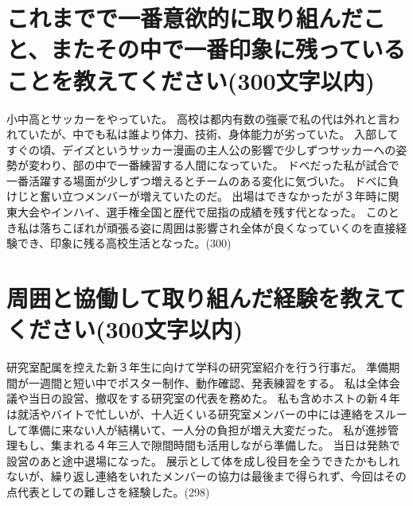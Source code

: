 \documentclass[platex,dvipdfmx]{jlreq}			%
\begin{document}
\section{これまでで一番意欲的に取り組んだこと、またその中で一番印象に残っていることを教えてください(300文字以内)}
小中高とサッカーをやっていた。
高校は都内有数の強豪で私の代は外れと言われていたが、中でも私は誰より体力、技術、身体能力が劣っていた。
入部してすぐの頃、デイズというサッカー漫画の主人公の影響で少しずつサッカーへの姿勢が変わり、部の中で一番練習する人間になっていた。
ドベだった私が試合で一番活躍する場面が少しずつ増えるとチームのある変化に気づいた。
ドベに負けじと奮い立つメンバーが増えていたのだ。
出場はできなかったが３年時に関東大会やインハイ、選手権全国と歴代で屈指の成績を残す代となった。
このとき私は落ちこぼれが頑張る姿に周囲は影響され全体が良くなっていくのを直接経験でき、印象に残る高校生活となった。(300)


\section{周囲と協働して取り組んだ経験を教えてください(300文字以内)}
研究室配属を控えた新３年生に向けて学科の研究室紹介を行う行事だ。
準備期間が一週間と短い中でポスター制作、動作確認、発表練習をする。
私は全体会議や当日の設営、撤収をする研究室の代表を務めた。
私も含めホストの新４年は就活やバイトで忙しいが、十人近くいる研究室メンバーの中には連絡をスルーして準備に来ない人が結構いて、一人分の負担が増え大変だった。
私が進捗管理もし、集まれる４年三人で隙間時間も活用しながら準備した。
当日は発熱で設営のあと途中退場になった。
展示として体を成し役目を全うできたかもしれないが、繰り返し連絡をいれたメンバーの協力は最後まで得られず、今回はその点代表としての難しさを経験した。(298)
\end{document}
